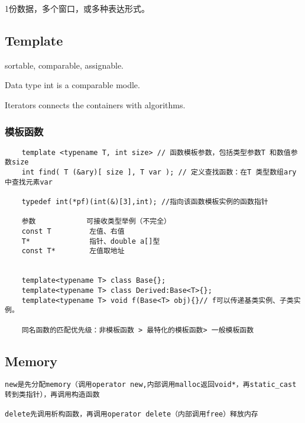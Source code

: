\documentclass[UTF8]{../computerUniverse}
\begin{document}
1份数据，多个窗口，或多种表达形式。






\subsection{Template}
sortable, comparable, assignable.

Data type int is a comparable modle.

Iterators connects the containers with algorithms.


\subsubsection{模板函数}
\begin{lstlisting}
    template <typename T, int size> // 函数模板参数，包括类型参数T 和数值参数size
    int find( T (&ary)[ size ], T var ); // 定义查找函数：在T 类型数组ary 中查找元素var
    
    typedef int(*pf)(int(&)[3],int); //指向该函数模板实例的函数指针

    参数            可接收类型举例（不完全）
    const T         左值、右值
    T*              指针、double a[]型
    const T*        左值取地址


    template<typename T> class Base{};
    template<typename T> class Derived:Base<T>{};
    template<typename T> void f(Base<T> obj){}// f可以传递基类实例、子类实例。

    同名函数的匹配优先级：非模板函数 > 最特化的模板函数> 一般模板函数

\end{lstlisting}




\subsection{Memory}

\begin{lstlisting}
new是先分配memory（调用operator new,内部调用malloc返回void*，再static_cast转到类指针），再调用构造函数

delete先调用析构函数，再调用operator delete（内部调用free）释放内存
\end{lstlisting}
\end{document}
